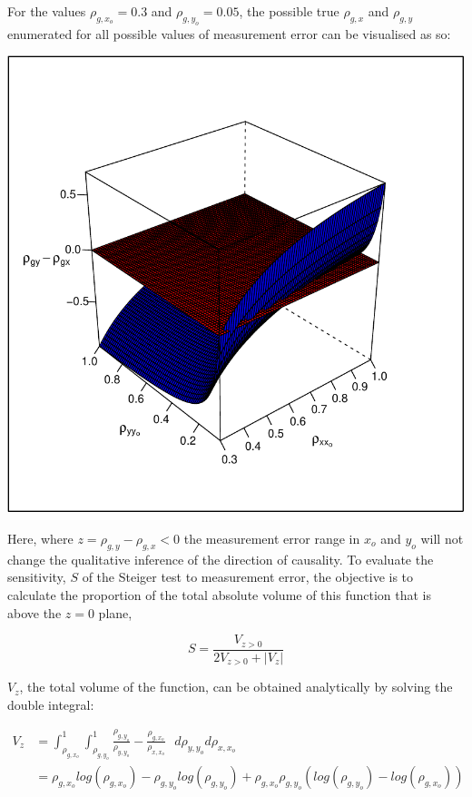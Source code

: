 \documentclass[]{article}
\begin{document}
For the values \(\rho_{g,x_o} = 0.3\) and \(\rho_{g,y_o} = 0.05\), the
possible true \(\rho_{g,x}\) and \(\rho_{g,y}\) enumerated for all
possible values of measurement error can be visualised as so:

\includegraphics{manuscript_files/figure-latex/unnamed-chunk-1-1.pdf}

Here, where \(z = \rho_{g,y} - \rho_{g,x} < 0\) the measurement error
range in \(x_o\) and \(y_o\) will not change the qualitative inference
of the direction of causality. To evaluate the sensitivity, \(S\) of the
Steiger test to measurement error, the objective is to calculate the
proportion of the total absolute volume of this function that is above
the \(z = 0\) plane,

\[
S = \frac{V_{z>0}}{2V_{z>0} + |V_{z}|}
\]

\(V_{z}\), the total volume of the function, can be obtained
analytically by solving the double integral:

\[
\begin{aligned}
V_z & = \int^1_{\rho_{g,x_o}} \int^1_{\rho_{g,y_o}} \frac{\rho_{g,y_o}}{\rho_{y,y_o}} - \frac{\rho_{g,x_o}}{\rho_{x,x_o}}\,\,\,\, d\rho_{y,y_o}d\rho_{x,x_o} \\
& = \rho_{g,x_o}log(\rho_{g,x_o}) - \rho_{g,y_o}log(\rho_{g,y_o}) + \rho_{g,x_o}\rho_{g,y_o}(log(\rho_{g,y_o})-log(\rho_{g,x_o}))
\end{aligned}
\]
\end{document}
